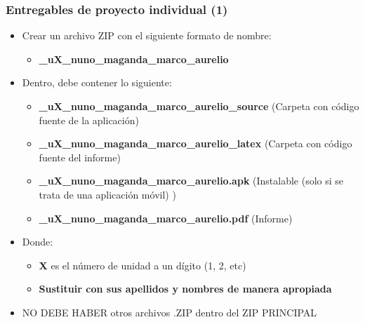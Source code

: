 

\begin{frame}
\frametitle{Entregables de proyecto individual (1)}
    \begin{itemize}
    \item Crear un archivo ZIP con el siguiente formato de nombre:
    \begin{itemize}
        \item \textbf{\clavegrupo\_uX\_nuno\_maganda\_marco\_aurelio}
    \end{itemize}
    \item Dentro, debe contener lo siguiente:
        \begin{itemize}
        \item \textbf{\clavegrupo\_uX\_nuno\_maganda\_marco\_aurelio\_source} (Carpeta con c\'odigo fuente de la aplicaci\'on)
        \item \textbf{\clavegrupo\_uX\_nuno\_maganda\_marco\_aurelio\_latex} (Carpeta con c\'odigo fuente del informe)
        \item \textbf{\clavegrupo\_uX\_nuno\_maganda\_marco\_aurelio.apk} (Instalable (solo si se trata de una aplicación móvil) )
        \item \textbf{\clavegrupo\_uX\_nuno\_maganda\_marco\_aurelio.pdf} (Informe)
        \end{itemize}
    \item Donde:
        \begin{itemize}
        \item \textbf{X} es el n\'umero de unidad a un d\'igito (1, 2, etc)
        \item \textbf{Sustituir con sus apellidos y nombres de manera apropiada} 
        \end{itemize}
	\item NO DEBE HABER otros archivos .ZIP dentro del ZIP PRINCIPAL
    \end{itemize}
\end{frame}


